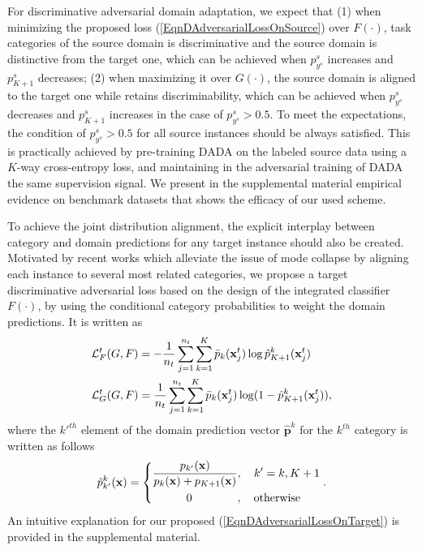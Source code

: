 \documentclass[letterpaper]{article} \usepackage{aaai20}  \usepackage{times}  \usepackage{helvet} \usepackage{courier}  \usepackage[hyphens]{url}  \usepackage{graphicx} \urlstyle{rm} \def\UrlFont{\rm}  \usepackage{graphicx}  \frenchspacing  \setlength{\pdfpagewidth}{8.5in}  \setlength{\pdfpageheight}{11in}
\begin{document}
For discriminative adversarial domain adaptation, we expect that (1) when minimizing the proposed loss (\ref{EqnDAdversarialLossOnSource}) over $F(\cdot)$, task categories of the source domain is discriminative and the source domain is distinctive from the target one, which can be achieved when $p_{y^s}^s$ increases and $p_{K+1}^s$ decreases; (2) when maximizing it over $G(\cdot)$, the source domain is aligned to the target one while retains discriminability, which can be achieved when $p_{y^s}^s$ decreases and $p_{K+1}^s$ increases in the case of $p_{y^s}^s>0.5$. To meet the expectations, the condition of $p_{y^s}^s>0.5$ for all source instances should be always satisfied. This is practically achieved by pre-training DADA on the labeled source data using a $K$-way cross-entropy loss, and maintaining in the adversarial training of DADA the same supervision signal. We present in the supplemental material empirical evidence on benchmark datasets that shows the efficacy of our used scheme. 

To achieve the joint distribution alignment, the explicit interplay between category and domain predictions for any target instance should also be created. Motivated by recent works \cite{mada,cdan} which alleviate the issue of mode collapse by aligning each instance to several most related categories, we propose a target discriminative adversarial loss based on the design of the integrated classifier $F(\cdot)$, by using the conditional category probabilities to weight the domain predictions. It is written as 
\begin{eqnarray}\label{EqnDAdversarialLossOnTarget}
\begin{aligned}
&{\cal{L}}^t_{F} (G, F) =  - \frac{1}{n_t} \sum_{j=1}^{n_t} \sum_{k=1}^K \bar{p}_k(\mathbf{x}_j^t) \log \hat{p}_{K+1}^k (\mathbf{x}_j^t) \\
&{\cal{L}}^t_{G} (G, F) =  \frac{1}{n_t} \sum_{j=1}^{n_t} \sum_{k=1}^K \bar{p}_k(\mathbf{x}_j^t) \log (1-\hat{p}_{K+1}^k (\mathbf{x}_j^t)), 
\end{aligned}
\end{eqnarray}
where the ${k'}^{th}$ element of the domain prediction vector $\hat{\mathbf{p}}^{k}$ for the $k^{th}$ category is written as follows
\begin{equation}
\hat{p}_{k'}^{k}(\mathbf{x}) = \left\{  
\begin{aligned}
&\frac{p_{k'}(\mathbf{x})}{p_{k}(\mathbf{x})+p_{K+1}(\mathbf{x})}, \quad k'=k, K+1  \\
&\qquad\quad 0 \qquad\qquad, \quad {\rm otherwise}
\end{aligned}  
\right. .
\end{equation}
An intuitive explanation for our proposed (\ref{EqnDAdversarialLossOnTarget}) is provided in the supplemental material.
\end{document}
